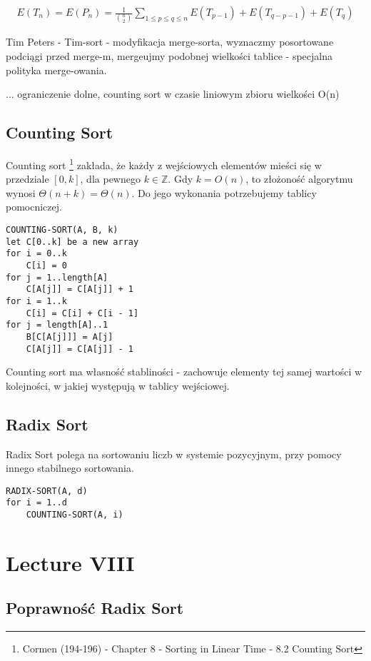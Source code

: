 \documentclass{article}
\numberwithin{equation}{subsection}
\begin{document}
\begin{align}
    E(T_n) = E(P_n) = \frac{1}{\binom{n}{2}} \sum_{1\leq p \leq q\leq n} E(T_{p-1}) + E(T_{q-p-1}) + E(T_q)
\end{align}

Tim Peters - Tim-sort - modyfikacja merge-sorta, wyznaczmy posortowane podciągi przed merge-m, mergeujmy podobnej wielkości tablice - specjalna polityka merge-owania.


... ograniczenie dolne, counting sort w czasie liniowym zbioru wielkości O(n)

\subsection{Counting Sort}

Counting sort
\footnote{Cormen (194-196) - Chapter 8 - Sorting in Linear Time - 8.2 Counting Sort} 
zakłada, że każdy z wejściowych elementów mieści się w przedziale $[0,k]$, dla pewnego $k\in\mathbb{Z}$.
Gdy $k=O(n)$, to złożoność algorytmu wynosi $\Theta(n+k) = \Theta(n)$.
\noindent
Do jego wykonania potrzebujemy tablicy pomocniczej.
\begin{verbatim}
COUNTING-SORT(A, B, k)
let C[0..k] be a new array
for i = 0..k
    C[i] = 0
for j = 1..length[A]
    C[A[j]] = C[A[j]] + 1
for i = 1..k
    C[i] = C[i] + C[i - 1]
for j = length[A]..1
    B[C[A[j]]] = A[j]
    C[A[j]] = C[A[j]] - 1
\end{verbatim}
Counting sort ma własność stabliności - zachowuje elementy tej samej wartości w kolejności, w jakiej występują w tablicy wejściowej.

\subsection{Radix Sort}

Radix Sort polega na sortowaniu liczb w systemie pozycyjnym, przy pomocy innego stabilnego sortowania.

\begin{verbatim}
RADIX-SORT(A, d)
for i = 1..d
    COUNTING-SORT(A, i)
\end{verbatim}

\section{Lecture VIII}

\subsection{Poprawność Radix Sort}
\end{document}
